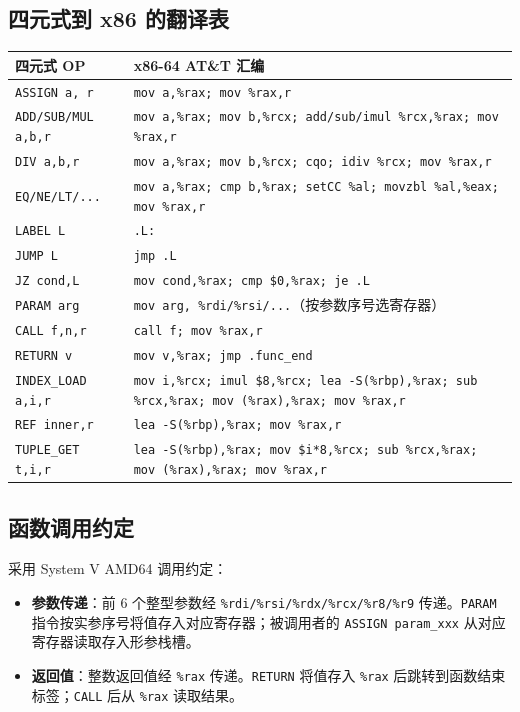 \documentclass[12pt,a4paper]{ctexart}
\begin{document}
\subsection{四元式到 x86 的翻译表}

\begin{longtable}{|>{\raggedright\arraybackslash}p{4cm}|>{\raggedright\arraybackslash}p{9cm}|}
\hline
\textbf{四元式 OP} & \textbf{x86-64 AT\&T 汇编} \\
\hline
\endhead
\texttt{ASSIGN a, r} & \texttt{mov a,\%rax; mov \%rax,r} \\
\hline
\texttt{ADD/SUB/MUL a,b,r} & \texttt{mov a,\%rax; mov b,\%rcx; add/sub/imul \%rcx,\%rax; mov \%rax,r} \\
\hline
\texttt{DIV a,b,r} & \texttt{mov a,\%rax; mov b,\%rcx; cqo; idiv \%rcx; mov \%rax,r} \\
\hline
\texttt{EQ/NE/LT/...} & \texttt{mov a,\%rax; cmp b,\%rax; setCC \%al; movzbl \%al,\%eax; mov \%rax,r} \\
\hline
\texttt{LABEL L} & \texttt{.L:} \\
\hline
\texttt{JUMP L} & \texttt{jmp .L} \\
\hline
\texttt{JZ cond,L} & \texttt{mov cond,\%rax; cmp \$0,\%rax; je .L} \\
\hline
\texttt{PARAM arg} & \texttt{mov arg, \%rdi/\%rsi/...}（按参数序号选寄存器） \\
\hline
\texttt{CALL f,n,r} & \texttt{call f; mov \%rax,r} \\
\hline
\texttt{RETURN v} & \texttt{mov v,\%rax; jmp .func\_end} \\
\hline
\texttt{INDEX\_LOAD a,i,r} & \texttt{mov i,\%rcx; imul \$8,\%rcx; lea -S(\%rbp),\%rax; sub \%rcx,\%rax; mov (\%rax),\%rax; mov \%rax,r} \\
\hline
\texttt{REF inner,r} & \texttt{lea -S(\%rbp),\%rax; mov \%rax,r} \\
\hline
\texttt{TUPLE\_GET t,i,r} & \texttt{lea -S(\%rbp),\%rax; mov \$i*8,\%rcx; sub \%rcx,\%rax; mov (\%rax),\%rax; mov \%rax,r} \\
\hline
\end{longtable}

\subsection{函数调用约定}

采用 System V AMD64 调用约定：
\begin{itemize}
    \item \textbf{参数传递}：前 6 个整型参数经 \texttt{\%rdi/\%rsi/\%rdx/\%rcx/\%r8/\%r9} 传递。\texttt{PARAM} 指令按实参序号将值存入对应寄存器；被调用者的 \texttt{ASSIGN param\_xxx} 从对应寄存器读取存入形参栈槽。
    \item \textbf{返回值}：整数返回值经 \texttt{\%rax} 传递。\texttt{RETURN} 将值存入 \texttt{\%rax} 后跳转到函数结束标签；\texttt{CALL} 后从 \texttt{\%rax} 读取结果。
\end{itemize}
\end{document}
